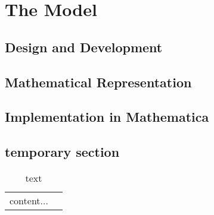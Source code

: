 \documentclass[main.tex]{subfiles}
\begin{document}
  \section{The Model}
    \subsection{Design and Development}
      \lipsum[4]
    \subsection{Mathematical Representation}
      \lipsum[5]
    \subsection{Implementation in Mathematica}
      \lipsum[6]
    \subsection{temporary section}
      \begin{table}[h!]
        \label{tab:coordinates}
        \centering
        \caption{text}
        \begin{tabular}{ c c }
          content...
        \end{tabular}
      \end{table}
\end{document}
